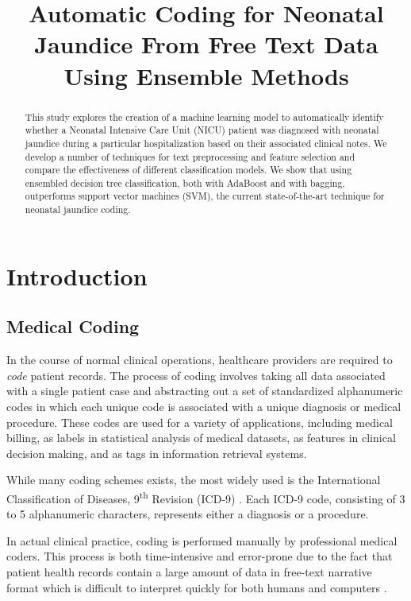 \documentclass[conference]{IEEEtran}
\begin{document}
\title{Automatic Coding for Neonatal Jaundice From Free Text Data Using Ensemble Methods
}


\author{
}

\maketitle

\begin{abstract}
This study explores the creation of a machine learning model to automatically identify whether a Neonatal Intensive Care Unit (NICU) patient was diagnosed with neonatal jaundice during a particular hospitalization based on their associated clinical notes. We develop a number of techniques for text preprocessing and feature selection and compare the effectiveness of different classification models. We show that using ensembled decision tree classification, both with AdaBoost  and with bagging, outperforms support vector machines (SVM), the current state-of-the-art technique for neonatal jaundice coding.
\end{abstract}

\section{Introduction}
\subsection{Medical Coding}\label{AA}
In the course of normal clinical operations, healthcare providers are  required to \textit{code} patient records. The process of coding involves taking all data associated with a single patient case and abstracting out a set of standardized alphanumeric codes in which each unique code is associated with a unique diagnosis or medical procedure. These codes are used for a variety of applications, including medical billing, as labels in statistical analysis of medical datasets, as features in clinical decision making, and as tags in information retrieval systems. 

While many coding schemes exists, the most widely used is the International Classification of Diseases, 9\textsuperscript{th} Revision (ICD-9) \cite{Slee}. Each ICD-9 code, consisting of 3 to 5 alphanumeric characters, represents either a diagnosis or a procedure.

In actual clinical practice, coding is performed manually by professional medical coders. This process is both time-intensive and error-prone due to the fact that patient health records contain a large amount of data in free-text narrative format which is difficult to interpret quickly for both humans and computers \cite{Tange}\cite{OMalley}. 
\end{document}
